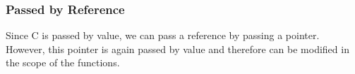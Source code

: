\subsubsection{Passed by Reference}
Since C is passed by value, we can pass a reference by passing a pointer. However, this pointer is again passed by value and therefore can be modified in the scope of the functions.
